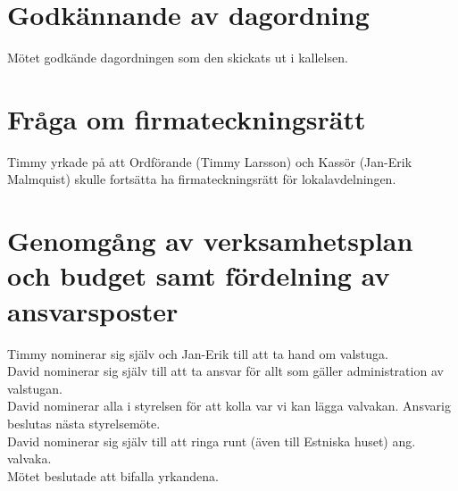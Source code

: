 \documentclass[a4paper,10pt]{article}
\begin{document}
\section{Godkännande av dagordning}
Mötet godkände dagordningen som den skickats ut i kallelsen.

\section{Fråga om firmateckningsrätt}
Timmy yrkade på att Ordförande (Timmy Larsson) och Kassör (Jan-Erik Malmquist) skulle fortsätta ha firmateckningsrätt för lokalavdelningen.

\section{Genomgång av verksamhetsplan och budget samt fördelning av ansvarsposter}
Timmy nominerar sig själv och Jan-Erik till att ta hand om valstuga.\\
David nominerar sig själv till att ta ansvar för allt som gäller administration av valstugan.\\
David nominerar alla i styrelsen för att kolla var vi kan lägga valvakan. Ansvarig beslutas nästa styrelsemöte.\\
David nominerar sig själv till att ringa runt (även till Estniska huset) ang. valvaka.\\
Mötet beslutade att bifalla yrkandena.
\end{document}
